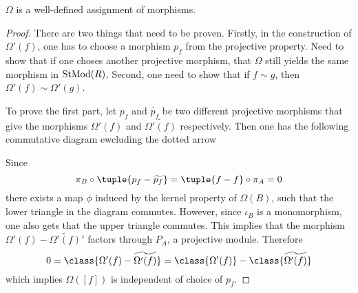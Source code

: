\begin{lemma}
    \label{lem:omega_f_is_well_defined}
    \( \Omega \) is a well-defined assignment of morphisms.
\end{lemma}
\begin{proof}
    There are two things that need to be proven. Firstly, in the construction of \( \Omega'(f) \), one has to choose a morphism \( p_f \) from the projective property. Need to show that if one choses another projective morphism, that \( \Omega \) still yields the same morphism in \( \operatorname{StMod}(R) \). Second, one need to show that if \( f \sim g \), then \( \Omega'(f) \sim \Omega'(g) \).

    To prove the first part, let \( p_f \) and \( \widetilde{p_f} \) be two different projective morphisms that give the morphisms \( \Omega'(f) \) and \( \widetilde{\Omega'(f)} \) respectively. Then one has the following commutative diagram ewcluding the dotted arrow
    \begin{center}
    \end{center}

    Since
    \[
        \pi_B \circ \tuple{p_f - \widetilde{p_f}} = \tuple{f - f} \circ \pi_A = 0
    \]
    there exists a map \( \phi \) induced by the kernel property of \( \Omega(B) \), such that the lower triangle in the diagram commutes. However, since \( \iota_B \) is a monomorphism, one also gets that the upper triangle commutes. This implies that the morphism \( \Omega'(f) - \widetilde{\Omega'(f)}' \) factors through \( P_A \), a projective module. Therefore
    \[
        0 = \class{\Omega'(f) - \widetilde{\Omega'(f)}} = \class{\Omega'(f)} - \class{\widetilde{\Omega'(f)}}
    \]
    which implies \( \Omega([f]) \) is independent of choice of \( p_f \).


\end{proof}
